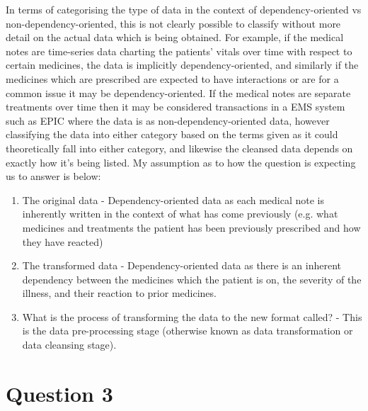 \documentclass{scrreprt}
\begin{document}
 \noindent In terms of categorising the type of data in the context of dependency-oriented vs non-dependency-oriented, this is not clearly possible to classify without more detail on the actual data which is being obtained. For example, if the medical notes are time-series data charting the patients' vitals over time with respect to certain medicines, the data is implicitly dependency-oriented, and similarly if the medicines which are prescribed are expected to have interactions or are for a common issue it may be dependency-oriented. If the medical notes are separate treatments over time then it may be considered transactions in a EMS system such as EPIC where the data is as non-dependency-oriented data, however classifying the data into either category based on the terms given as it could theoretically fall into either category, and likewise the cleansed data depends on exactly how it's being listed. My assumption as to how the question is expecting us to answer is below:
\begin{enumerate}
	\item The original data - Dependency-oriented data as each medical note is inherently written in the context of what has come previously (e.g. what medicines and treatments the patient has been previously prescribed and how they have reacted)
	\item The transformed data - Dependency-oriented data as there is an inherent dependency between the medicines which the patient is on, the severity of the illness, and their reaction to prior medicines.
	\item What is the process of transforming the data to the new format called? - This is the data pre-processing stage (otherwise known as data transformation or data cleansing stage).
\end{enumerate}

	
\newpage	
\chapter{Question 3}
\end{document}
